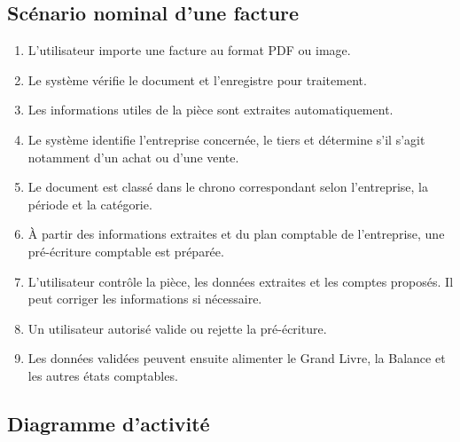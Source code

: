 \documentclass[12pt,a4paper,oneside]{report}
\begin{document}
\subsection{Scénario nominal d'une facture}

\begin{enumerate}[leftmargin=*]
  \item L'utilisateur importe une facture au format PDF ou image.
  \item Le système vérifie le document et l'enregistre pour traitement.
  \item Les informations utiles de la pièce sont extraites automatiquement.
  \item Le système identifie l'entreprise concernée, le tiers et détermine s'il s'agit notamment d'un achat ou d'une vente.
  \item Le document est classé dans le chrono correspondant selon l'entreprise, la période et la catégorie.
  \item À partir des informations extraites et du plan comptable de l'entreprise, une pré-écriture comptable est préparée.
  \item L'utilisateur contrôle la pièce, les données extraites et les comptes proposés. Il peut corriger les informations si nécessaire.
  \item Un utilisateur autorisé valide ou rejette la pré-écriture.
  \item Les données validées peuvent ensuite alimenter le Grand Livre, la Balance et les autres états comptables.
\end{enumerate}

\subsection{Diagramme d'activité}
\end{document}
